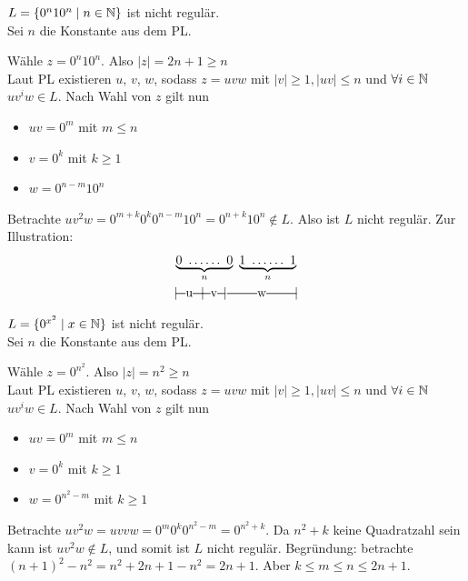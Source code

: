 \begin{Bsp*}
        $L=\{0^n10^n \mid n\in\mathbb{N}\}$ ist nicht regulär.\\
        Sei $n$ die Konstante aus dem \ac{PL}.
        
        Wähle $z=0^n10^n$. Also $|z|=2n+1\geq n$\\
        Laut PL existieren $u$, $v$, $w$, sodass $z=uvw$ mit $|v|\geq 1, |uv|\leq n$ und $\forall i \in \mathbb{N}$ $uv^iw \in L$. Nach Wahl von $z$ gilt nun
  \begin{itemize}
  \item $uv = 0^m$ mit $m\leq n$
  \item $v = 0^k$ mit $k\geq 1$
  \item $w = 0^{n-m}10^n$ 
  \end{itemize}
  Betrachte $uv^2w = 0^{m+k}0^k0^{n-m}10^n = 0^{n+k}10^n \notin L$.
  Also ist $L$ nicht regulär.
  Zur Illustration:
        \begin{gather*}
                \underbrace{0\ \dots\dots\ 0}_{n} \ \underbrace{1\ \dots\dots\ 1}_{n}\\
                |\!\ruleplaceholder[u]{\widthof{0\ \dots }} \!|\! \ruleplaceholder[v]{\widthof{\dots 0}}\!|%
                \ruleplaceholder[w]{\widthof{\ \ \ $1\ \dots\dots\ 1$}}\!|
        \end{gather*}
  
\end{Bsp*}
\begin{Bsp*}
        $L=\{0^{x^2} \mid x\in\mathbb{N}\}$ ist nicht regulär.\\
        Sei $n$ die Konstante aus dem \ac{PL}.
        
        Wähle $z=0^{n^2}$. Also $|z|=n^2\geq n$\\
        Laut PL existieren $u$, $v$, $w$, sodass $z=uvw$ mit $|v|\geq 1, |uv|\leq n$ und $\forall i \in \mathbb{N}$ $uv^iw \in L$. Nach Wahl von $z$ gilt nun
  \begin{itemize}
  \item $uv = 0^m$ mit $m\leq n$
  \item $v = 0^k$ mit $k\geq 1$
  \item $w = 0^{n^2 - m}$ mit $k\geq 1$
  \end{itemize}
  Betrachte $uv^2w = uvvw = 0^{m}0^k0^{n^2-m} = 0^{n^2+k}$.
  Da $n^2+k$ keine Quadratzahl sein kann ist $uv^2w \not \in L$, und somit ist $L$ nicht regulär.
  Begründung: betrachte $(n+1)^2 - n^2 = n^2 + 2n + 1 - n^2 = 2n + 1$.
  Aber $k \le m \le n \le 2n + 1$.
\end{Bsp*}

